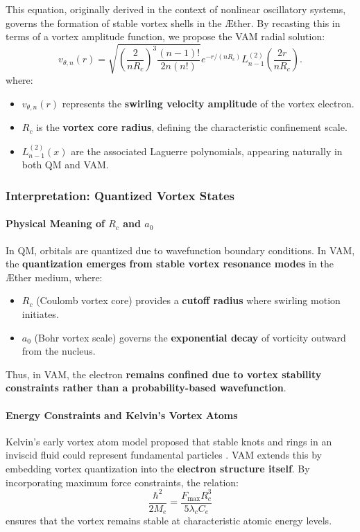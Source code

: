 \documentclass[a4paper,10pt]{article}
\begin{document}
This equation, originally derived in the context of nonlinear oscillatory systems, governs the formation of stable vortex shells in the Æther. By recasting this in terms of a vortex amplitude function, we propose the VAM radial solution:
\begin{equation*}
    v_{\theta, n}(r) = \sqrt{\left(\frac{2}{n R_c}\right)^3 \frac{(n-1)!}{2n(n!)}} e^{-r / (n R_c)} L_{n-1}^{(2)}\left(\frac{2r}{n R_c}\right).
\end{equation*}
where:
\begin{itemize}
    \item \( v_{\theta, n}(r) \) represents the \textbf{swirling velocity amplitude} of the vortex electron.
    \item \( R_c \) is the \textbf{vortex core radius}, defining the characteristic confinement scale.
    \item \( L_{n-1}^{(2)}(x) \) are the associated Laguerre polynomials, appearing naturally in both QM and VAM.
\end{itemize}

\subsubsection{Interpretation: Quantized Vortex States}

\paragraph*{Physical Meaning of \( R_c \) and \( a_0 \)}
In QM, orbitals are quantized due to wavefunction boundary conditions. In VAM, the \textbf{quantization emerges from stable vortex resonance modes} in the Æther medium, where:
\begin{itemize}
    \item \( R_c \) (Coulomb vortex core) provides a \textbf{cutoff radius} where swirling motion initiates.
    \item \( a_0 \) (Bohr vortex scale) governs the \textbf{exponential decay} of vorticity outward from the nucleus.
\end{itemize}
Thus, in VAM, the electron \textbf{remains confined due to vortex stability constraints rather than a probability-based wavefunction}.

\paragraph*{Energy Constraints and Kelvin's Vortex Atoms}
Kelvin's early vortex atom model proposed that stable knots and rings in an inviscid fluid could represent fundamental particles \cite{kelvin1867}. VAM extends this by embedding vortex quantization into the \textbf{electron structure itself}. By incorporating maximum force constraints, the relation:
\begin{equation*}
    \frac{\hbar^2}{2M_e} = \frac{F_{\max} R_c^3}{5 \lambda_c C_e}
\end{equation*}
ensures that the vortex remains stable at characteristic atomic energy levels.
\end{document}
